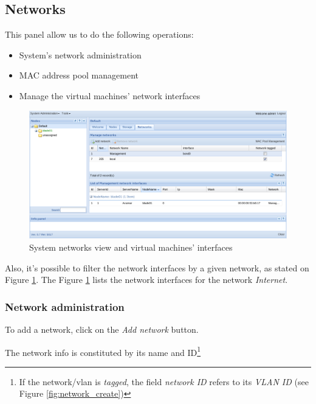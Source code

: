 \subsection{Networks}
\label{sub:network}

This panel allow us to do the following operations:

\begin{itemize}
    \item System's network administration
    \item MAC address pool management
    \item Manage the virtual machines' network interfaces
\end{itemize}

\begin{figure}[H]
	\begin{center}
	\includegraphics[scale=0.45]{screenshots/main_networks.png}
	\caption{System networks view and virtual machines' interfaces}
	\label{fig:main_networks}
	\end{center}
\end{figure}

Also, it's possible to filter the network interfaces by a given network, as stated on Figure \ref{fig:main_networks}.
The Figure \ref{fig:main_networks} lists the network interfaces for the network \emph{Internet}.

\subsubsection{Network administration}

To add a network, click on the \emph{Add network} button.

The network info is constituted by its name and ID\footnote{If the network/vlan is \emph{tagged}, the field \emph{network ID} refers to its \emph{VLAN ID} (see Figure \ref{fig:network_create})}

